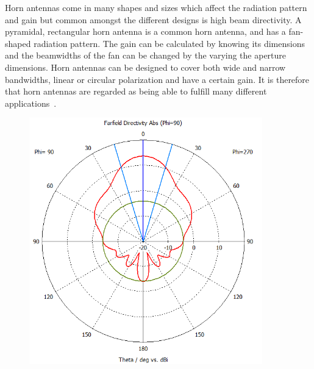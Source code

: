 Horn antennas come in many shapes and sizes which affect the radiation pattern and gain but common amongst the different designs is high beam directivity. A pyramidal, rectangular horn antenna is a common horn antenna, and has a fan-shaped radiation pattern. The gain can be calculated by knowing its dimensions and the beamwidths of the fan can be changed by the varying the aperture dimensions. Horn antennas can be designed to cover both wide and narrow bandwidths, linear or circular polarization and have a certain gain. It is therefore that horn antennas are regarded as being able to fulfill many different applications~\cite[p. 14.1-14.3]{ant_eng_hk}.  
\begin{figure}[H]
    \begin{minipage}{0.45\textwidth}
        \centering
        \includegraphics[width=0.9\textwidth]{figures/farfield (f=2.4) horn.png} %
    \end{minipage}\hfill
    \begin{minipage}{0.45\textwidth}
        \centering

\end{minipage}
\end{figure}
